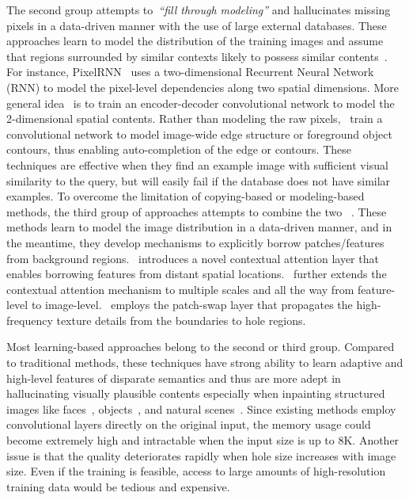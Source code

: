 \documentclass[oribibl]{llncs}  \usepackage[width=122mm,left=12mm,paperwidth=146mm,height=193mm,top=12mm,paperheight=217mm]{geometry}
\begin{document}
The second group attempts to~\emph{``fill through modeling''} and hallucinates missing pixels in a data-driven manner with the use of large external databases. These approaches learn to model the distribution of the training images and assume that regions surrounded by similar contexts likely to possess similar contents~\cite{iizuka2017globally, liao2018edge, oord2016pixel, pathak2016context, xiong2019foreground, yang2017high}. For instance, PixelRNN~\cite{oord2016pixel} uses a two-dimensional Recurrent Neural Network (RNN) to model the pixel-level dependencies along two spatial dimensions. More general idea~\cite{iizuka2017globally,yang2017high} is to train an encoder-decoder convolutional network to model the 2-dimensional spatial contents. Rather than modeling the raw pixels,~\cite{liao2018edge, xiong2019foreground} train a convolutional network to model image-wide edge structure or foreground object contours, thus enabling auto-completion of the edge or contours. These techniques are effective when they find an example image with sufficient visual similarity to the query, but will easily fail if the database does not have similar examples. To overcome the limitation of copying-based or modeling-based methods, the third group of approaches attempts to combine the two ~\cite{liu2018image,song2018contextual,yan2018shift,yu2018free,yu2018generative,zeng2019learning}. These methods learn to model the image distribution in a data-driven manner, and in the meantime, they develop mechanisms to explicitly borrow patches/features from background regions.~\cite{yu2018generative} introduces a novel contextual attention layer that enables borrowing features from distant spatial locations.~\cite{zeng2019learning} further extends the contextual attention mechanism to multiple scales and all the way from feature-level to image-level.~\cite{song2018contextual} employs the patch-swap layer that propagates the high-frequency texture details from the boundaries to hole regions.

Most learning-based approaches belong to the second or third group. Compared to traditional methods, these techniques have strong ability to learn adaptive and high-level features of disparate semantics and thus are more adept in hallucinating visually plausible contents especially when inpainting structured images like faces~\cite{iizuka2017globally,oord2016pixel,song2018contextual,yu2018free,yu2018generative,zeng2019learning}, objects~\cite{liao2018edge,pathak2016context,xiong2019foreground,yang2017high}, and natural scenes~\cite{iizuka2017globally,song2018contextual,yu2018free,yu2018generative}. Since existing methods employ convolutional layers directly on the original input, the memory usage could become extremely high and intractable when the input size is up to 8K. Another issue is that the quality deteriorates rapidly when hole size increases with image size. Even if the training is feasible, access to large amounts of high-resolution training data would be tedious and expensive.
\end{document}
